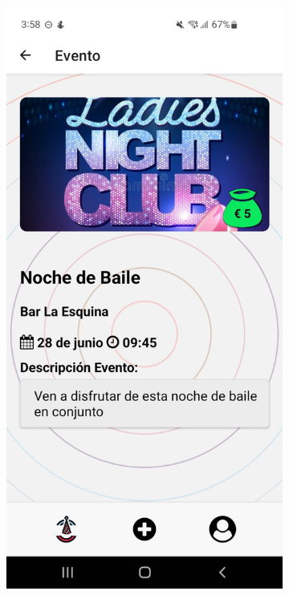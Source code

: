 \clearpage
\vspace*{\fill}
\begin{figure}[H]
    \centering
    \begin{subfigure}{0.45\textwidth}
        \centering
        \includegraphics[width=\linewidth]{imagenes/Capturas/DatosEventoUsuario.jpeg}

\end{subfigure}
\end{figure}
